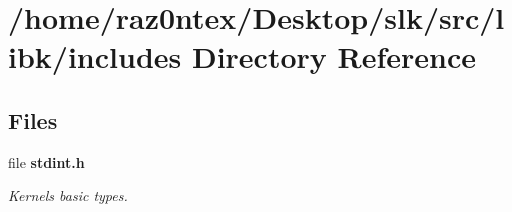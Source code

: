 \section{/home/raz0ntex/\+Desktop/slk/src/libk/includes Directory Reference}
\label{dir_7a45aca16af675dd5662d1b4947f203a}
\subsection*{Files}
\begin{DoxyCompactItemize}
\item 
file \textbf{ stdint.\+h}
\begin{DoxyCompactList}\small\item\em Kernel\textquotesingle{}s basic types. \end{DoxyCompactList}\end{DoxyCompactItemize}
